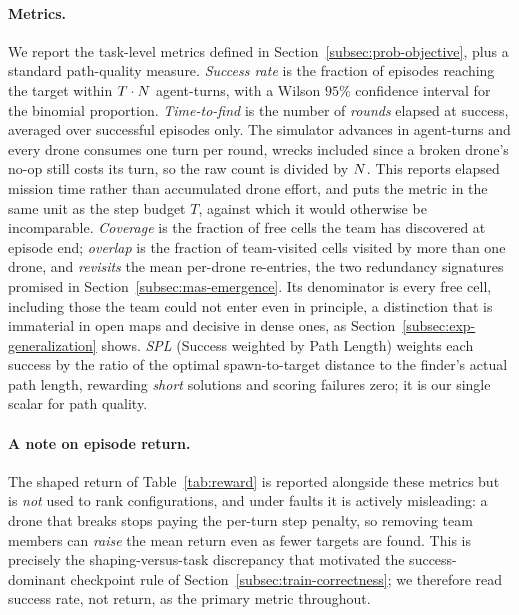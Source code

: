 \paragraph{Metrics.}
We report the task-level metrics defined in
Section~\ref{subsec:prob-objective}, plus a standard path-quality measure.
\emph{Success rate} is the fraction of episodes reaching the target within
$T\cdot N$ agent-turns, with a Wilson $95\%$ confidence interval for the
binomial proportion. \emph{Time-to-find} is the number of \emph{rounds} elapsed
at success, averaged over successful episodes only. The simulator advances in
agent-turns and every drone consumes one turn per round, wrecks included since a
broken drone's no-op still costs its turn, so the raw count is divided by
$N$. This reports elapsed mission time rather than accumulated drone
effort, and puts the metric in the same unit as the step budget $T$, against
which it would otherwise be incomparable. \emph{Coverage} is the fraction of free
cells the team has discovered at episode end; \emph{overlap} is the fraction of
team-visited cells visited by more than one drone, and \emph{revisits} the mean
per-drone re-entries, the two redundancy signatures promised in
Section~\ref{subsec:mas-emergence}. Its denominator is every free cell, including
those the team could not enter even in principle, a distinction that is
immaterial in open maps and decisive in dense ones, as
Section~\ref{subsec:exp-generalization} shows. \emph{SPL} (Success weighted by Path Length)
\citep{anderson2018evaluation} weights each success by the ratio of the
optimal spawn-to-target distance to the finder's actual path length, rewarding
\emph{short} solutions and scoring failures zero; it is our single scalar for
path quality.

\paragraph{A note on episode return.}
The shaped return of Table~\ref{tab:reward} is reported alongside these metrics
but is \emph{not} used to rank configurations, and under faults it is actively
misleading: a drone that breaks stops paying the per-turn step penalty, so
removing team members can \emph{raise} the mean return even as fewer targets are
found. This is precisely the shaping-versus-task discrepancy that motivated the
success-dominant checkpoint rule of Section~\ref{subsec:train-correctness}; we
therefore read success rate, not return, as the primary metric throughout.

